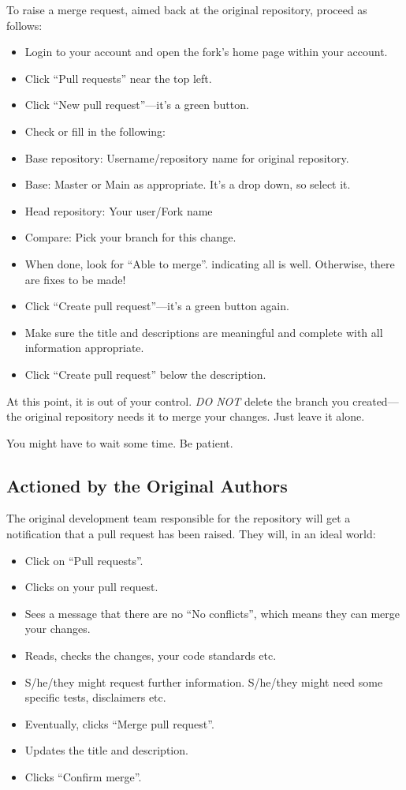 To raise a merge request, aimed back at the original repository, proceed as follows:

\begin{itemize}
    \item Login to your account and open the fork's home page within your account.
    \item Click ``Pull requests'' near the top left.
    \item Click ``New pull request''---it's a green button.
    \item Check or fill in the following:
    \item Base repository: Username/repository name for original repository.
    \item Base: Master or Main as appropriate. It's a drop down, so select it.
    \item Head repository: Your user/Fork name
    \item Compare: Pick your branch for this change.
    \item When done, look for ``Able to merge''. indicating all is well. Otherwise, there are fixes to be made!
    \item Click ``Create pull request''---it's a green button again.
    \item Make sure the title and descriptions are meaningful and complete with all information appropriate.
    \item Click ``Create pull request'' below the description.
\end{itemize}

At this point, it is out of your control. \emph{DO NOT} delete the branch you created---the original repository needs it to merge your changes. Just leave it alone.

You might have to wait some time. Be patient.

\subsection{Actioned by the Original Authors}

The original development team responsible for the repository will get a notification that a pull request has been raised. They will, in an ideal world:

\begin{itemize}
    \item Click on ``Pull requests''.
    \item Clicks on your pull request.
    \item Sees a message that there are no ``No conflicts'', which means they can merge your changes.
    \item Reads, checks the changes, your code standards etc.
    \item S/he/they might request further information. S/he/they might need some specific tests, disclaimers etc.
    \item Eventually, clicks ``Merge pull request''.
    \item Updates the title and description.
    \item Clicks ``Confirm merge''.
\end{itemize}

